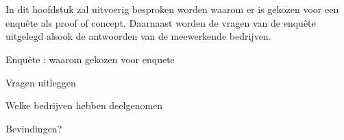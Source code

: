 
\chapter{}
\label{ch:methodologie}


In dit hoofdstuk zal uitvoerig besproken worden waarom er is gekozen voor een enquête als proof of concept. Daarnaast worden de vragen van de enquête uitgelegd alsook de antwoorden van de meewerkende bedrijven.

Enquête : waarom gekozen voor enquete

Vragen uitleggen

Welke bedrijven hebben deelgenomen

Bevindingen?


